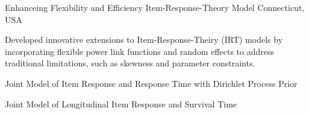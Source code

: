 

\begin{cventries}

  \cventry
    {} %
    {Enhanceing Flexibility and Efficiency Item-Response-Theory Model} %
    {Connecticut, USA} %
    {} %
    {
      \begin{cvitems} %
        \item {Developed innovative extensions to Item-Response-Theiry (IRT) models by incorporating flexible power link functions and random effects to address traditional limitations, such as skewness and parameter constraints.}
        \item {Joint Model of Item Response and Response Time with Dirichlet Process Prior}
        \item {Joint Model of Longitudinal Item Response and Survival Time}
      \end{cvitems}
    }

    
\end{cventries}
